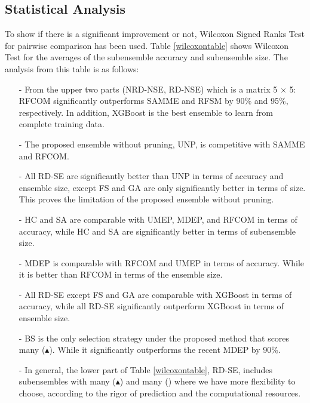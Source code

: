 \subsection{Statistical Analysis}\label{statistical}
 To show if there is a significant improvement or not, Wilcoxon Signed Ranks Test \cite{wilcoxon1945} for pairwise comparison has been used. Table \ref{wilcoxontable} shows Wilcoxon Test \cite{wilcoxon1945} for the averages of the subensemble accuracy and subensemble size. The analysis from this table is as follows:
\begin{itemize}[nosep]
    \item[-] From the upper two parts (NRD-NSE, RD-NSE) which is a matrix 5 $\times$ 5: RFCOM significantly outperforms SAMME and RFSM by 90\% and 95\%, respectively. In addition, XGBoost is the best ensemble to learn from complete training data.
    \item[-] The proposed ensemble without pruning, UNP, is competitive with SAMME and RFCOM.
    
    \item[-] All RD-SE are significantly better than UNP in terms of accuracy and ensemble size, except FS and GA are only significantly better in terms of size. This proves the limitation of the proposed ensemble without pruning. 
    \item[-] HC and SA are comparable with UMEP, MDEP, and RFCOM in terms of accuracy, while HC and SA are significantly better in terms of subensemble size.
    \item[-] MDEP is comparable with RFCOM and UMEP in terms of accuracy. While it is better than RFCOM in terms of the ensemble size.
   
    \item[-] All RD-SE except FS and GA are comparable with XGBoost in terms of accuracy, while all RD-SE significantly outperform XGBoost in terms of ensemble size.  
    
     \item[-] BS is the only selection strategy under the proposed method that scores many ($\blacktriangle$). While it significantly outperforms the recent MDEP by 90\%.
     
    \item[-] In general, the lower part of Table \ref{wilcoxontable}, RD-SE,  includes subensembles with many ($\blacktriangle$) and many (\textbullet) where we have more flexibility to choose, according to the rigor of prediction and the computational resources.   
\end{itemize}

